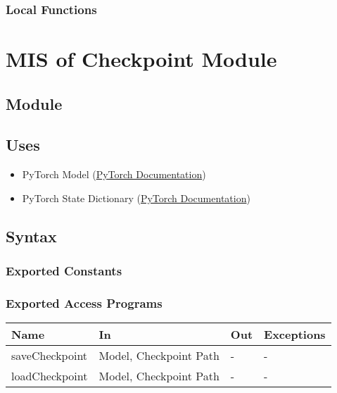 \documentclass[12pt, titlepage]{article}
\begin{document}
\subsubsection{Local Functions}

\newpage

\section{MIS of Checkpoint Module} \label{Module} 

\subsection{Module}



\subsection{Uses}
\begin{itemize}
  \item PyTorch Model (\href{https://pytorch.org/docs/stable/generated/torch.nn.Module.html}{PyTorch Documentation})
  \item PyTorch State Dictionary (\href{https://pytorch.org/tutorials/beginner/saving_loading_models.html}{PyTorch Documentation})
\end{itemize}

\subsection{Syntax}



\subsubsection{Exported Constants}



\subsubsection{Exported Access Programs}

\begin{center}
\begin{tabular}{p{3cm}|p{5cm}|p{2cm}|p{2cm}}
\hline
\textbf{Name} & \textbf{In} & \textbf{Out} & \textbf{Exceptions} \\
\hline
saveCheckpoint & Model, Checkpoint Path & - & - \\
\hline
loadCheckpoint & Model, Checkpoint Path & - & - \\
\hline
\end{tabular}
\end{center}
\end{document}
